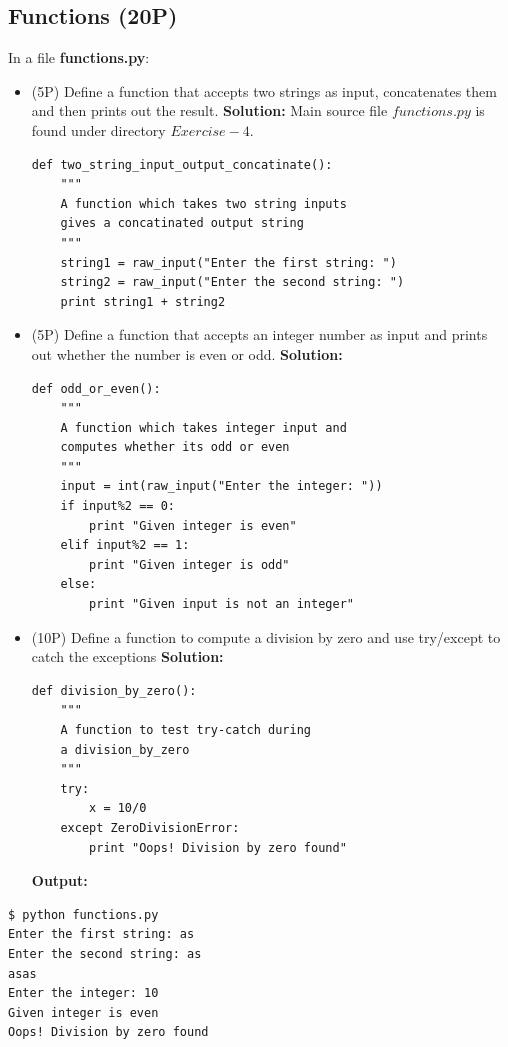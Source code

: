 \documentclass{llncs}
\begin{document}
\subsection{Functions (20P)}
In a file \textbf{functions.py}:
\begin{itemize}
\item (5P) Define a function that accepts two strings as input, concatenates 
them and then prints out the result.
\subitem \textbf{Solution: } Main source file $functions.py$ is found under 
directory $Exercise-4$. 
\begin{lstlisting}
def two_string_input_output_concatinate():
    """
    A function which takes two string inputs
    gives a concatinated output string
    """
    string1 = raw_input("Enter the first string: ")
    string2 = raw_input("Enter the second string: ")
    print string1 + string2
\end{lstlisting}

\item (5P) Define a function that accepts an integer number as input and
prints out whether the number is even or odd.
\subitem \textbf{Solution: } 
\begin{lstlisting}
def odd_or_even():
    """
    A function which takes integer input and
    computes whether its odd or even
    """
    input = int(raw_input("Enter the integer: "))
    if input%2 == 0:
        print "Given integer is even"
    elif input%2 == 1:
        print "Given integer is odd"
    else:
        print "Given input is not an integer"
\end{lstlisting}
\item (10P) Define a function to compute a division by zero and use
try/except to catch the exceptions
\subitem \textbf{Solution: }
\begin{lstlisting}
def division_by_zero():
    """
    A function to test try-catch during 
    a division_by_zero
    """
    try:
        x = 10/0
    except ZeroDivisionError:
        print "Oops! Division by zero found"
\end{lstlisting}
\textbf{Output:} \\
\end{itemize}

\begin{lstlisting}
$ python functions.py                                                                                                                                                                    
Enter the first string: as
Enter the second string: as
asas
Enter the integer: 10
Given integer is even
Oops! Division by zero found
\end{lstlisting}
\end{document}
